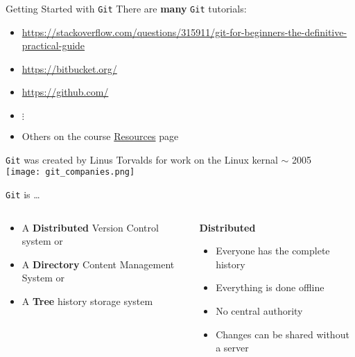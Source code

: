 \documentclass[onlymath, nologo]{beamer}
\begin{document}
  \begin{frame}{Getting Started with \texttt{Git}}
    There are \textbf{many} \texttt{Git} tutorials:
    \begin{itemize}
      \item \url{https://stackoverflow.com/questions/315911/git-for-beginners-the-definitive-practical-guide}%
      \item \url{https://bitbucket.org/} 
      \item \url{https://github.com/}
      \item \hspace{2.0em} $\vdots$
      \item Others on the course \href{https://iacs-cs-207.github.io/cs207-F17/resources.html}{Resources} page
    \end{itemize}
    \texttt{Git} was created by Linus Torvalds for work on the Linux kernal $\sim$ 2005 \\[0.5em]
    \centering
    \texttt{[image: git\_companies.png]}
  \end{frame}

  \begin{frame}{\texttt{Git} is \ldots}
    \begin{columns}[c]
      \begin{column}{0.5\textwidth}
        \begin{itemize}
          \item A \textbf{Distributed} Version Control system or \\[1.0em]
          \item A \textbf{Directory} Content Management System or \\[1.0em]
          \item A \textbf{Tree} history storage system
        \end{itemize}
      \end{column}
      \begin{column}{0.5\textwidth}
        \begin{center}
          \textbf{Distributed}
        \end{center}
        \begin{itemize}
          \item Everyone has the complete history
          \item Everything is done offline 
          \item No central authority 
          \item Changes can be shared without a server
        \end{itemize}
        \vfill
      \end{column}
    \end{columns}
  \end{frame}
\end{document}
